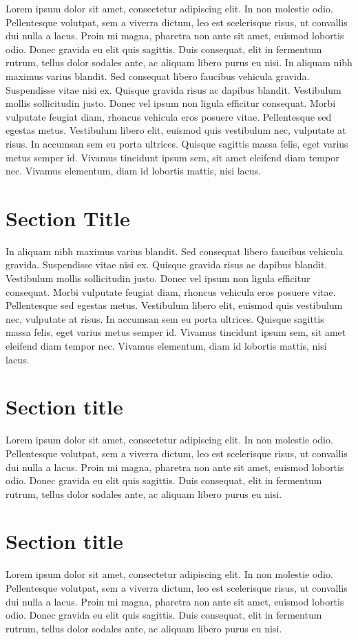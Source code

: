 \documentclass[12pt]{report}
\begin{document}
Lorem ipsum dolor sit amet, consectetur adipiscing elit. In non molestie odio. Pellentesque volutpat, sem a viverra dictum, leo est scelerisque risus, ut convallis dui nulla a lacus. Proin mi magna, pharetra non ante sit amet, euismod lobortis odio. Donec gravida eu elit quis sagittis. Duis consequat, elit in fermentum rutrum, tellus dolor sodales ante, ac aliquam libero purus eu nisi. In aliquam nibh maximus varius blandit. Sed consequat libero faucibus vehicula gravida. Suspendisse vitae nisi ex. Quisque gravida risus ac dapibus blandit. Vestibulum mollis sollicitudin justo. Donec vel ipsum non ligula efficitur consequat. Morbi vulputate feugiat diam, rhoncus vehicula eros posuere vitae. Pellentesque sed egestas metus. Vestibulum libero elit, euismod quis vestibulum nec, vulputate at risus. In accumsan sem eu porta ultrices. Quisque sagittis massa felis, eget varius metus semper id. Vivamus tincidunt ipsum sem, sit amet eleifend diam tempor nec. Vivamus elementum, diam id lobortis mattis, nisi lacus.

\section{Section Title}
In aliquam nibh maximus varius blandit. Sed consequat libero faucibus vehicula gravida. Suspendisse vitae nisi ex. Quisque gravida risus ac dapibus blandit. Vestibulum mollis sollicitudin justo. Donec vel ipsum non ligula efficitur consequat. Morbi vulputate feugiat diam, rhoncus vehicula eros posuere vitae. Pellentesque sed egestas metus. Vestibulum libero elit, euismod quis vestibulum nec, vulputate at risus. In accumsan sem eu porta ultrices. Quisque sagittis massa felis, eget varius metus semper id. Vivamus tincidunt ipsum sem, sit amet eleifend diam tempor nec. Vivamus elementum, diam id lobortis mattis, nisi lacus.

\section{Section title}
Lorem ipsum dolor sit amet, consectetur adipiscing elit. In non molestie odio. Pellentesque volutpat, sem a viverra dictum, leo est scelerisque risus, ut convallis dui nulla a lacus. Proin mi magna, pharetra non ante sit amet, euismod lobortis odio. Donec gravida eu elit quis sagittis. Duis consequat, elit in fermentum rutrum, tellus dolor sodales ante, ac aliquam libero purus eu nisi. 

\section{Section title}
Lorem ipsum dolor sit amet, consectetur adipiscing elit. In non molestie odio. Pellentesque volutpat, sem a viverra dictum, leo est scelerisque risus, ut convallis dui nulla a lacus. Proin mi magna, pharetra non ante sit amet, euismod lobortis odio. Donec gravida eu elit quis sagittis. Duis consequat, elit in fermentum rutrum, tellus dolor sodales ante, ac aliquam libero purus eu nisi. 
\end{document}
